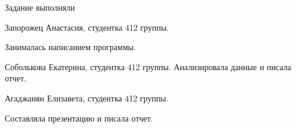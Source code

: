 \documentclass{beamer}
\begin{document}
\begin{frame}{Задание выполняли} 
\begin{itemize} 
{ \item Запорожец Анастасия, студентка 412 группы. 

Занималась написанием программы.
\item Соболькова Екатерина, студентка 412 группы. Анализировала данные и писала отчет.
\item Агаджанян Елизавета, студентка 412 группы. 

Составляла презентацию и писала отчет. 
} 
\end{itemize}
\end{frame}
\end{document}
